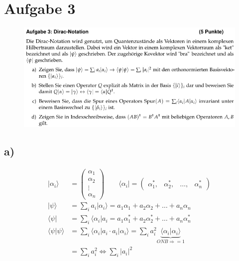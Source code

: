 \section{Aufgabe 3}

    \begin{figure}[H]
        \centering
        \includegraphics[width=\textwidth]{images/Aufgabe3.jpg}
        \label{fig:5}
    \end{figure}

\subsection{a)}

    \begin{align*}
        \vert \alpha_i \rangle &= 
        \begin{pmatrix}
            \alpha_1\\
            \alpha_2\\
            \vdots\\
            \alpha_n
        \end{pmatrix} \qquad
        \langle \alpha_i \vert =
        \begin{pmatrix}
            \alpha_1^*, & \alpha_2^*, & \ldots, & \alpha_n^*
        \end{pmatrix}\\
        \vert \psi \rangle &= \sum_{i} a_i \vert \alpha_i \rangle = a_1 \alpha_1 + a_2 \alpha_2 + \ldots + a_n \alpha_n\\
        \langle \psi \vert &= \sum_{i} \langle \alpha_i \vert a_i = a_1 \alpha_1^* + a_2 \alpha_2^* + \ldots + a_n \alpha_n^*\\
        \langle \psi \vert \psi \rangle &= \sum_{i} \langle \alpha_i \vert a_i \cdot a_i \vert \alpha_i \rangle 
        = \sum_{i} a_i^2 \underbrace{\langle \alpha_i \vert \alpha_i \rangle}_{ONB \Rightarrow =1}\\
        &= \sum_{i} a_i^2 \Leftrightarrow \sum_{i} \vert a_i \vert^2
    \end{align*}

